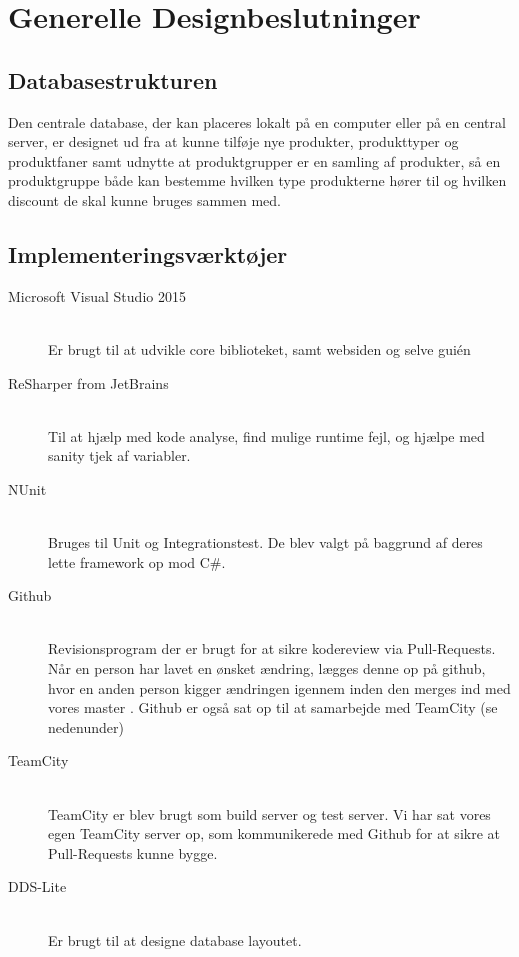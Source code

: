 \section{Generelle Designbeslutninger}

\subsection{Databasestrukturen}
Den centrale database, der kan placeres lokalt på en computer eller på en central server, er designet ud fra at kunne tilføje nye produkter, produkttyper og produktfaner samt udnytte at produktgrupper er en samling af produkter, så en produktgruppe både kan bestemme hvilken type produkterne hører til og hvilken discount de skal kunne bruges sammen med.

\subsection{Implementeringsværktøjer}
\begin{description}
  \item[Microsoft Visual Studio 2015] \hfill \\
  Er brugt til at udvikle core biblioteket, samt websiden og selve gui\'en
  \item[ReSharper from JetBrains] \hfill \\
  Til at hjælp med kode analyse, find mulige runtime fejl, og hjælpe med sanity tjek af variabler.
  \item[NUnit] \hfill \\
  Bruges til Unit og Integrationstest. De blev valgt på baggrund af deres lette framework op mod C\#.
  \item[Github] \hfill \\
  Revisionsprogram der er brugt for at sikre kodereview via Pull-Requests. Når en person har lavet en ønsket ændring, lægges denne op på github, hvor en anden person kigger ændringen igennem inden den merges ind med vores master \citeauthor{gh:pullrequests}. Github er også sat op til at samarbejde med TeamCity (se nedenunder)
  \item[TeamCity] \hfill \\
  TeamCity er blev brugt som build server og test server. Vi har sat vores egen TeamCity server op, som kommunikerede med Github for at sikre at Pull-Requests kunne bygge.
  \item[DDS-Lite] \hfill \\
  Er brugt til at designe database layoutet.
\end{description}

